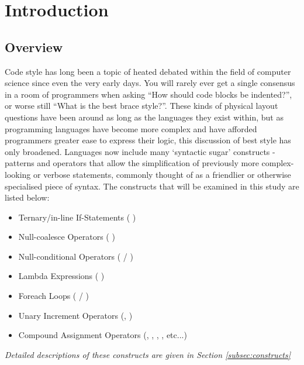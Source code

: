 \documentclass{article}
\begin{document}
\newpage
\section{Introduction}
    \subsection{Overview}
    \label{sec:overview}
        Code style has long been a topic of heated debated within the field of computer science since even the very early days. You will rarely ever get a single consensus in a room of programmers when asking ``How should code blocks be indented?'', or worse still ``What is the best brace style?''. These kinds of physical layout questions have been around as long as the languages they exist within, but as programming languages have become more complex and have afforded programmers greater ease to express their logic, this discussion of best style has only broadened. Languages now include many `syntactic sugar' constructs - patterns and operators that allow the simplification of previously more complex-looking or verbose statements, commonly thought of as a friendlier or otherwise specialised piece of syntax. The constructs that will be examined in this study are listed below:

        \begin{itemize}
            \item Ternary/in-line If-Statements (  )
            \item Null-coalesce Operators (  )
            \item Null-conditional Operators (  / )
            \item Lambda Expressions (  )
            \item Foreach Loops (  / )
            \item Unary Increment Operators (, )
            \item Compound Assignment Operators (,  , , , etc...)
        \end{itemize}
        
        \emph{Detailed descriptions of these constructs are given in Section \ref{subsec:constructs}}\\
\end{document}
